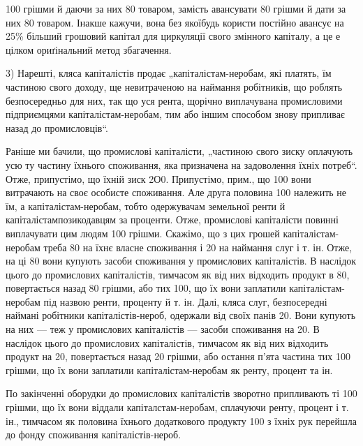 \parcont{}  %
100 грішми й даючи за них 80 товаром, замість авансувати 80 грішми й
дати за них 80 товаром. Інакше кажучи, вона без якоїбудь користи постійно авансує на 25\%
більший грошовий капітал для циркуляції свого змінного капіталу, а це е цілком ориґінальний метод
збагачення.

3) Нарешті, кляса капіталістів продає „капіталістам-неробам, які платять, їм частиною свого доходу,
ще невитраченою на наймання робітників, що роблять безпосередньо для них, так що уся рента, щорічно
виплачувана промисловими підприємцями капіталістам-неробам, тим або іншим способом знову припливає
назад до промисловців“.

Раніше ми бачили, що промислові капіталісти, „частиною свого зиску оплачують усю ту частину їхнього
споживання, яка призначена на задоволення їхніх потреб“. Отже, припустімо, що їхній зиск \deq{} 2О0. Припустімо, прим., що 100 вони витрачають на своє особисте споживання. Але друга
половина \deq{} 100 належить не їм, а капіталістам-неробам, тобто одержувачам земельної ренти й
капіталістампозикодавцям
за проценти. Отже, промислові капіталісти повинні виплачувати цим людям 100 грішми.
Скажімо, що з цих грошей капіталістам-неробам треба 80 на їхнє власне споживання і 20 на наймання слуг і т. ін. Отже, на ці 80 вони купують засоби споживання у
промислових капіталістів. В наслідок цього до промислових капіталістів, тимчасом як від них
відходить продукт в 80, повертається назад 80 грішми, або  тих 100,
що їх вони заплатили капіталістам-неробам під назвою ренти, проценту й т. ін. Далі, кляса слуг,
безпосередні наймані робітники капіталістів-нероб, одержали від своїх панів 20. Вони
купують на них — теж у промислових капіталістів — засоби споживання на 20. В наслідок цього
до промислових капіталістів, тимчасом як від них відходить продукт на 20, повертається
назад 20 грішми, або остання п’ята частина тих 100 грішми, що їх вони заплатили
капіталістам-неробам як ренту, процент та ін.

По закінченні оборудки до промислових капіталістів зворотно припливають ті 100 грішми, що
їх вони віддали капіталстам-неробам, сплачуючи ренту, процент і т. ін., тимчасом як половина їхнього
додаткового продукту \deq{} 100 з їхніх рук перейшла до фонду споживання капіталістів-нероб.

